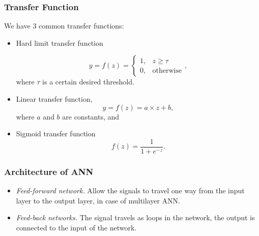 \documentclass{beamer}
\begin{document}
\begin{frame}
    \frametitle{Transfer Function}
    We have $3$ common transfer functions:
    \begin{itemize}
        \item Hard limit transfer function
        
       \begin{equation}
        y=f(z)=
        \begin{cases}
          1, & z \ge \tau\\
          0, & \text{otherwise}
        \end{cases},
       \end{equation}
       where $\tau$ is a certain desired threshold.

        \item Linear transfer function,
        \begin{equation}
            y=f(z)=a\times z+b,
        \end{equation}
        where $a$ and $b$ are constants, and
        \item Sigmoid transfer function
        \begin{equation}
            f(z)=\frac{1}{1+e^{-z}}.
        \end{equation}
    \end{itemize}

\end{frame}


\begin{frame}
    \frametitle{Architecture of ANN}
        \begin{itemize}
            \item \textit{Feed-forward network.} Allow the signals to travel one way from the input layer to the output layer, in case of multilayer ANN.
            \item \textit{Feed-back networks.} The signal travels as loops in the network, the output is connected to the input of the network.    
       
        \end{itemize}


    

\end{frame}
\end{document}
